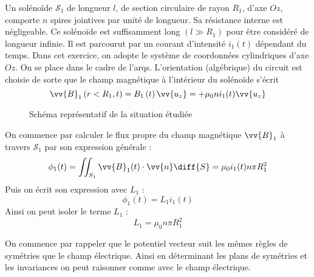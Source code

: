 
Un solénoïde $\mathcal{S}_1$ de longueur $l$, de section circulaire de rayon $R_1$, d'axe $Oz$, comporte $n$ spires jointives par unité de longueur. Sa résistance interne est négligeable. Ce solénoïde est suffisamment long $\left( l \gg R_1 \right)$ pour être considéré de longueur infinie. Il est parcourut par un courant d'intensité $i_1 (t)$ dépendant du temps. Dans cet exercice, on adopte le système de coordonnées cylindriques d'axe $Oz$. On se place dans le cadre de l'\gls{arqs}. L'orientation (algébrique) du circuit est choisie de sorte que le champ magnétique à l'intérieur du solénoïde s'écrit
\begin{equation}
  \vv{B}_1 \left( r < R_1, t \right) = B_1 \left( t \right) \vv{u_z} = + \mu_0 n i_1 (t) \vv{u_z}
\end{equation}

\begin{figure}[H]
  \centering
  
  \caption{Schéma représentatif de la situation étudiée}
\end{figure}


On commence par calculer le flux propre du champ magnétique $\vv{B}_1$ à travers $\mathcal{S}_1$ par son expression générale :
\begin{equation}
  \phi_1 (t) = \iint_{S_1} \vv{B}_1 (t) \cdot \vv{n} \diff{S} = \mu_0 i_1 (t) n \pi R_1^2
\end{equation}
Puis on écrit son expression avec $L_1$ :
\begin{equation}
  \phi_1 (t) = L_1 i_1 (t)
\end{equation}
Ainsi on peut isoler le terme $L_1$ :
\begin{equation}
  \boxed{L_1 = \mu_0 n \pi R_1^2}
\end{equation}


On commence par rappeler que le potentiel vecteur suit les mêmes règles de symétries que le champ électrique. Ainsi en déterminant les plans de symétries et les invariances on peut raisonner comme avec le champ électrique.


